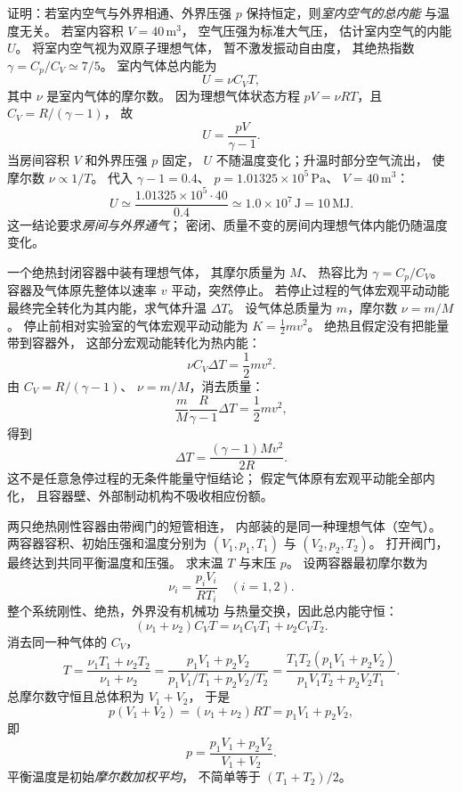 
证明：若室内空气与外界相通、外界压强
$p$ 保持恒定，则\emph{室内空气的总内能}
与温度无关。
若室内容积 $V=40\,\mathrm{m^3}$，
空气压强为标准大气压，
估计室内空气的内能 $U$。
\exsolution
将室内空气视为双原子理想气体，
暂不激发振动自由度，
其绝热指数 $\gamma=C_p/C_V\simeq7/5$。
室内气体总内能为
\[
U=\nu C_VT,
\]
其中 $\nu$ 是室内气体的摩尔数。
因为理想气体状态方程
$pV=\nu RT$，且
$C_V=R/(\gamma-1)$，
故
\[
\boxed{U=\frac{pV}{\gamma-1}}.
\]
当房间容积 $V$ 和外界压强 $p$ 固定，
$U$ 不随温度变化；升温时部分空气流出，
使摩尔数 $\nu\propto1/T$。
代入 $\gamma-1=0.4$、
$p=1.01325\times10^5\,\mathrm{Pa}$、
$V=40\,\mathrm{m^3}$：
\[
\boxed{U\simeq\frac{1.01325\times10^5\cdot40}{0.4}
\simeq1.0\times10^7\,\mathrm J=10\,\mathrm{MJ}}.
\]
\excheck 这一结论要求\emph{房间与外界通气}；
密闭、质量不变的房间内理想气体内能仍随温度变化。

一个绝热封闭容器中装有理想气体，
其摩尔质量为 $M$、
热容比为 $\gamma=C_p/C_V$。
容器及气体原先整体以速率 $v$
平动，突然停止。
若停止过程的气体宏观平动动能
最终完全转化为其内能，求气体升温 $\Delta T$。
\exsolution
设气体总质量为 $m$，摩尔数
$\nu=m/M$。
停止前相对实验室的气体宏观平动动能为
$K=\frac12mv^2$。
绝热且假定没有把能量带到容器外，
这部分宏观动能转化为热内能：
\[
\nu C_V\Delta T=\frac12mv^2.
\]
由
$C_V=R/(\gamma-1)$、
$\nu=m/M$，消去质量：
\[
\frac mM\frac{R}{\gamma-1}\Delta T
=\frac12mv^2,
\]
得到
\[
\boxed{\Delta T=\frac{(\gamma-1)Mv^2}{2R}}.
\]
\excheck 这不是任意急停过程的无条件能量守恒结论；
假定气体原有宏观平动能全部内化，
且容器壁、外部制动机构不吸收相应份额。

两只绝热刚性容器由带阀门的短管相连，
内部装的是同一种理想气体（空气）。
两容器容积、初始压强和温度分别为
$(V_1,p_1,T_1)$ 与 $(V_2,p_2,T_2)$。
打开阀门，最终达到共同平衡温度和压强。
求末温 $T$ 与末压 $p$。
\exsolution
设两容器最初摩尔数为
\[
\nu_i=\frac{p_iV_i}{RT_i}\quad(i=1,2).
\]
整个系统刚性、绝热，外界没有机械功
与热量交换，因此总内能守恒：
\[
(\nu_1+\nu_2)C_VT
=\nu_1C_VT_1+\nu_2C_VT_2.
\]
消去同一种气体的 $C_V$，
\[
T=\frac{\nu_1T_1+\nu_2T_2}{\nu_1+\nu_2}
=\boxed{\frac{p_1V_1+p_2V_2}
{p_1V_1/T_1+p_2V_2/T_2}}
=\boxed{\frac{T_1T_2(p_1V_1+p_2V_2)}
{p_1V_1T_2+p_2V_2T_1}}.
\]
总摩尔数守恒且总体积为 $V_1+V_2$，
于是
\[
p(V_1+V_2)=(\nu_1+\nu_2)RT
=p_1V_1+p_2V_2,
\]
即
\[
\boxed{p=\frac{p_1V_1+p_2V_2}{V_1+V_2}}.
\]
\excheck 平衡温度是初始\emph{摩尔数加权平均}，
不简单等于 $(T_1+T_2)/2$。

